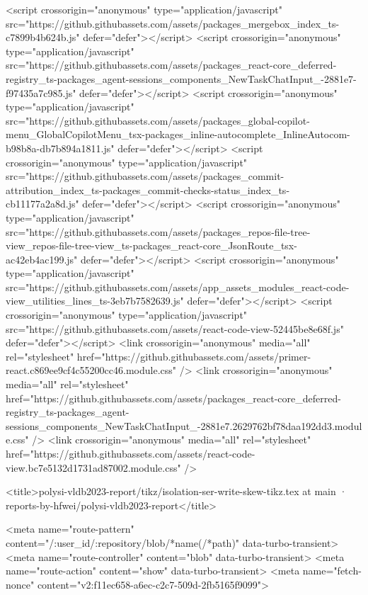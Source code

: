 <script crossorigin="anonymous" type="application/javascript" src="https://github.githubassets.com/assets/packages_mergebox_index_ts-c7899b4b624b.js" defer="defer"></script>
<script crossorigin="anonymous" type="application/javascript" src="https://github.githubassets.com/assets/packages_react-core_deferred-registry_ts-packages_agent-sessions_components_NewTaskChatInput_-2881e7-f97435a7c985.js" defer="defer"></script>
<script crossorigin="anonymous" type="application/javascript" src="https://github.githubassets.com/assets/packages_global-copilot-menu_GlobalCopilotMenu_tsx-packages_inline-autocomplete_InlineAutocom-b98b8a-db7b894a1811.js" defer="defer"></script>
<script crossorigin="anonymous" type="application/javascript" src="https://github.githubassets.com/assets/packages_commit-attribution_index_ts-packages_commit-checks-status_index_ts-cb11177a2a8d.js" defer="defer"></script>
<script crossorigin="anonymous" type="application/javascript" src="https://github.githubassets.com/assets/packages_repos-file-tree-view_repos-file-tree-view_ts-packages_react-core_JsonRoute_tsx-ac42eb4ac199.js" defer="defer"></script>
<script crossorigin="anonymous" type="application/javascript" src="https://github.githubassets.com/assets/app_assets_modules_react-code-view_utilities_lines_ts-3eb7b7582639.js" defer="defer"></script>
<script crossorigin="anonymous" type="application/javascript" src="https://github.githubassets.com/assets/react-code-view-52445be8e68f.js" defer="defer"></script>
<link crossorigin="anonymous" media="all" rel="stylesheet" href="https://github.githubassets.com/assets/primer-react.c869ee9cf4c55200cc46.module.css" />
<link crossorigin="anonymous" media="all" rel="stylesheet" href="https://github.githubassets.com/assets/packages_react-core_deferred-registry_ts-packages_agent-sessions_components_NewTaskChatInput_-2881e7.2629762bf78daa192dd3.module.css" />
<link crossorigin="anonymous" media="all" rel="stylesheet" href="https://github.githubassets.com/assets/react-code-view.bc7e5132d1731ad87002.module.css" />


  <title>polysi-vldb2023-report/tikz/isolation-ser-write-skew-tikz.tex at main · reports-by-hfwei/polysi-vldb2023-report</title>



  <meta name="route-pattern" content="/:user_id/:repository/blob/*name(/*path)" data-turbo-transient>
  <meta name="route-controller" content="blob" data-turbo-transient>
  <meta name="route-action" content="show" data-turbo-transient>
  <meta name="fetch-nonce" content="v2:f11ec658-a6ec-c2c7-509d-2fb5165f9099">

